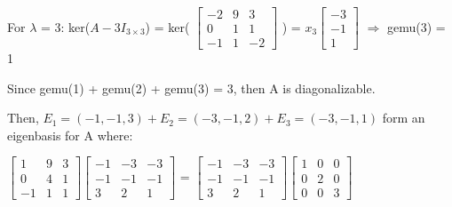 \begin{tbox}
        \hspace{0.5cm}
        For $\lambda$ = 3:
        \hspace{0.5cm}
        ker($A - 3I_{3 \times 3}$) =
        ker(
        \scriptsize
        $\begin{bmatrix}
            -2 & 9 & 3 \\
            0 & 1 & 1 \\
            -1 & 1 & -2
        \end{bmatrix}$
        \normalsize) =
        \scriptsize
        $x_3\begin{bmatrix}
            -3 \\
            -1 \\
            1
        \end{bmatrix}$
        \normalsize
        \hspace{0.1cm}
        $\Rightarrow$
        \hspace{0.5cm}
        gemu(3) = 1

        Since gemu(1) + gemu(2) + gemu(3) = 3, then A is diagonalizable.
        
        Then, $E_1 = (-1,-1,3) +  E_2 = (-3,-1,2) + E_3 = (-3,-1,1)$
        form an eigenbasis for A where:

        \hspace{0.5cm}
        \scriptsize
        $\begin{bmatrix}
            1 & 9 & 3 \\
            0 & 4 & 1 \\
            -1 & 1 & 1
        \end{bmatrix}
        \begin{bmatrix}
            -1 & -3 & -3 \\
            -1 & -1 & -1 \\
            3 & 2 & 1
        \end{bmatrix}$ =
        $\begin{bmatrix}
            -1 & -3 & -3 \\
            -1 & -1 & -1 \\
            3 & 2 & 1
        \end{bmatrix}
        \begin{bmatrix}
            1 & 0 & 0 \\
            0 & 2 & 0 \\
            0 & 0 & 3
        \end{bmatrix}$
        \normalsize
    \end{tbox}

